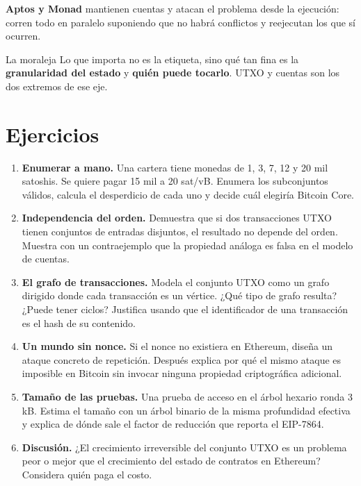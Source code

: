 \documentclass[11pt,a4paper]{article}
\theoremstyle{definition}
\theoremstyle{plain}
\theoremstyle{remark}
\begin{document}
\textbf{Aptos y Monad} mantienen cuentas y atacan el problema desde la ejecución:
corren todo en paralelo suponiendo que no habrá conflictos y reejecutan los que
sí ocurren.

\begin{clave}{La moraleja}
Lo que importa no es la etiqueta, sino qué tan fina es la \textbf{granularidad
del estado} y \textbf{quién puede tocarlo}. UTXO y cuentas son los dos extremos
de ese eje.
\end{clave}

\section{Ejercicios}\label{sec:ej}

\begin{enumerate}[leftmargin=1.8em,itemsep=0.8em]

\item\label{e:enum} \textbf{Enumerar a mano.}
Una cartera tiene monedas de 1, 3, 7, 12 y 20 mil satoshis. Se quiere pagar 15
mil a 20 sat/vB. Enumera los subconjuntos válidos, calcula el desperdicio de cada
uno y decide cuál elegiría Bitcoin Core.

\item\label{e:orden} \textbf{Independencia del orden.}
Demuestra que si dos transacciones UTXO tienen conjuntos de entradas disjuntos,
el resultado no depende del orden. Muestra con un contraejemplo que la propiedad
análoga es falsa en el modelo de cuentas.

\item\label{e:grafo} \textbf{El grafo de transacciones.}
Modela el conjunto UTXO como un grafo dirigido donde cada transacción es un
vértice. ¿Qué tipo de grafo resulta? ¿Puede tener ciclos? Justifica usando que el
identificador de una transacción es el hash de su contenido.

\item\label{e:replay} \textbf{Un mundo sin nonce.}
Si el nonce no existiera en Ethereum, diseña un ataque concreto de repetición.
Después explica por qué el mismo ataque es imposible en Bitcoin sin invocar
ninguna propiedad criptográfica adicional.

\item\label{e:pruebas} \textbf{Tamaño de las pruebas.}
Una prueba de acceso en el árbol hexario ronda 3 kB. Estima el tamaño con un
árbol binario de la misma profundidad efectiva y explica de dónde sale el factor
de reducción que reporta el EIP-7864.

\item\label{e:crec} \textbf{Discusión.}
¿El crecimiento irreversible del conjunto UTXO es un problema peor o mejor que el
crecimiento del estado de contratos en Ethereum? Considera quién paga el costo.

\end{enumerate}
\end{document}
